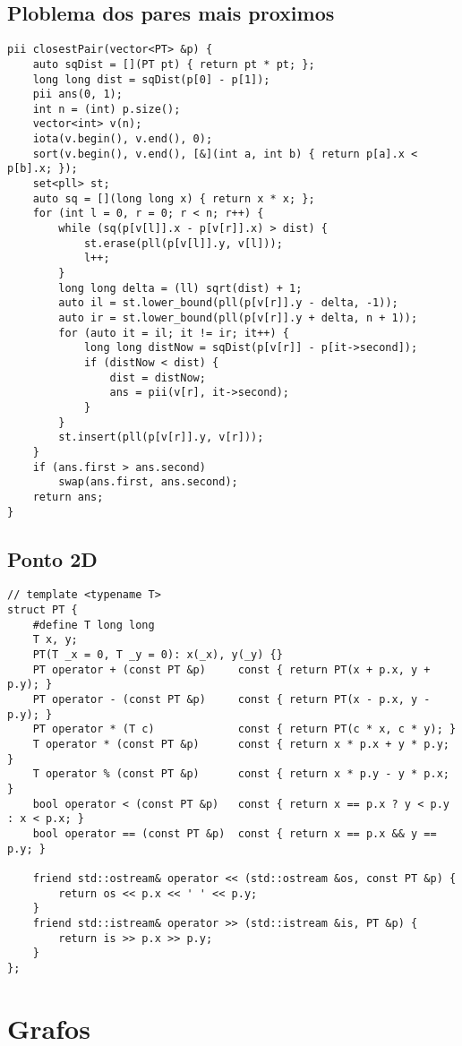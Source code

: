 \documentclass[12pt, a4paper, twoside]{article}
\begin{document}
\subsection{Ploblema dos pares mais proximos
}
\begin{lstlisting}
pii closestPair(vector<PT> &p) {
	auto sqDist = [](PT pt) { return pt * pt; };
	long long dist = sqDist(p[0] - p[1]);
	pii ans(0, 1);
	int n = (int) p.size();
	vector<int> v(n);
	iota(v.begin(), v.end(), 0);
	sort(v.begin(), v.end(), [&](int a, int b) { return p[a].x < p[b].x; });
	set<pll> st;
	auto sq = [](long long x) { return x * x; };
	for (int l = 0, r = 0; r < n; r++) {
		while (sq(p[v[l]].x - p[v[r]].x) > dist) {
			st.erase(pll(p[v[l]].y, v[l]));
			l++;
		}
		long long delta = (ll) sqrt(dist) + 1;
		auto il = st.lower_bound(pll(p[v[r]].y - delta, -1));
		auto ir = st.lower_bound(pll(p[v[r]].y + delta, n + 1));
		for (auto it = il; it != ir; it++) {
			long long distNow = sqDist(p[v[r]] - p[it->second]);
			if (distNow < dist) {
				dist = distNow;
				ans = pii(v[r], it->second);
			}
		}
		st.insert(pll(p[v[r]].y, v[r]));
	}
	if (ans.first > ans.second)
		swap(ans.first, ans.second);
	return ans;
}
\end{lstlisting}

\subsection{Ponto 2D
}
\begin{lstlisting}
// template <typename T>
struct PT {
	#define T long long
	T x, y;
	PT(T _x = 0, T _y = 0): x(_x), y(_y) {}
	PT operator + (const PT &p)		const { return PT(x + p.x, y + p.y); }
	PT operator - (const PT &p) 	const { return PT(x - p.x, y - p.y); }
	PT operator * (T c)				const { return PT(c * x, c * y); }
	T operator * (const PT &p) 		const { return x * p.x + y * p.y; }
	T operator % (const PT &p) 		const { return x * p.y - y * p.x; }
	bool operator < (const PT &p) 	const { return x == p.x ? y < p.y : x < p.x; }
	bool operator == (const PT &p) 	const { return x == p.x && y == p.y; }

	friend std::ostream& operator << (std::ostream &os, const PT &p) {
		return os << p.x << ' ' << p.y;
	}
	friend std::istream& operator >> (std::istream &is, PT &p) {
		return is >> p.x >> p.y;
	}
};
\end{lstlisting}



%
%

\section{Grafos}
\end{document}
